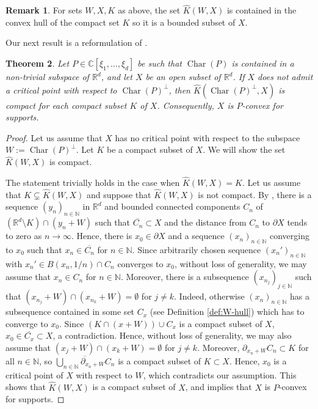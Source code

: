 \documentclass[a4paper,10pt]{amsart}
\newtheorem{theorem}{Theorem}
\newtheorem*{crucial lemma}{Lemma \ref{lem:nice polynomial2}}
\theoremstyle{definition}
\newtheorem{remark}[theorem]{Remark}
\newcommand{\R}{\mathbb{R}}
\newcommand{\C}{\mathbb{C}}
\newcommand{\N}{\mathbb{N}}
\newcommand{\charcone}{\operatorname{Char}}
\begin{document}
\begin{remark}\label{rem:W-hull bounded}
For sets $W,X,K$ as above, the set $\widehat{K}(W,X)$ is contained in the convex hull of the compact set $K$ so it is a bounded subset of $X$.     
\end{remark}

Our next result is a reformulation of \cite[Theorem 2]{Zachmanoglou69}.
\begin{theorem}\label{theorem: geometric sufficient condition for surjectivity}
	Let $P\in\C[\xi_1,\ldots,\xi_d]$ be such that $\charcone(P)$ is contained in a non-trivial subspace of $\R^d$, and let $X$ be an open subset of $\R^d$.
     If $X$ does not admit a critical point with respect to $\charcone(P)^\perp$, then $\widehat{K}(\charcone(P)^\perp,X)$ is compact for each compact subset $K$ of $X$. Consequently, $X$ is $P$-convex for supports.
\end{theorem}
\begin{proof}
Let us assume that $X$ has no critical point with respect to the subspace $W:=\charcone(P)^\perp$. Let $K$ be a compact subset of $X$. We will show the set $\widehat{K}(W,X)$ is compact.  

The statement trivially holds in the case when $\widehat{K}(W,X)=K$. Let us assume that $K\subsetneq\widehat{K}(W,X)$ and suppose that $\widehat{K}(W,X)$ is not compact. By \cite[Lemma 3]{Zachmanoglou69}, there is a sequence $(y_n)_{n\in\N}$ in $\R^d$ and bounded connected components $C_n$ of $(\R^d\setminus K)\cap(y_n+W)$ such that $\overline{C_n}\subset X$ and the distance from $C_n$ to $\partial X$ tends to zero as $n\to\infty$. Hence, there is
$x_0\in\partial X$ and a sequence $(x_n)_{n\in\N}$ converging to $x_0$ such that $x_n\in\overline{C_n}$ for $n\in\N$. Since arbitrarily chosen sequence $(x_n')_{n\in\N}$ with $x_n'\in B(x_n,1/n)\cap C_n$ converges to $x_0$, without loss of generality, we may assume that  $x_n\in C_n$ for $n\in\N$. 
Moreover, there is a subsequence $(x_{n_j})_{j\in\N}$ such that $(x_{n_j}+W)\cap(x_{n_k}+W)=\emptyset$ for $j\neq k$. Indeed, otherwise $(x_n)_{n\in\N}$ has a subsequence contained in some set $C_x$ (see Definition \ref{def:W-hull}) which has to converge to $x_0$. Since $(K\cap(x+W))\cup C_x$ is a compact subset of $X$, $x_0\in \overline{C_x}\subset X$, a contradiction. Hence, without loss of generality, we may also assume that $(x_j+W)\cap(x_k+W)=\emptyset$ for $j\neq k$. Moreover, $\partial_{x_n+W} C_n\subset K$ for all $n\in\N$, so 
$\overline{\bigcup_{n\in\N}\partial_{x_n+W} C_n}$ is a compact subset of $K\subset X$. Hence, $x_0$ is a critical point of $X$ with respect to $W$, which contradicts our assumption.
This shows that $\widehat{K}(W,X)$ is a compact subset of $X$, and \cite[Theorem 3]{Zachmanoglou69} implies that $X$ is $P$-convex for supports.
\end{proof}
\end{document}
